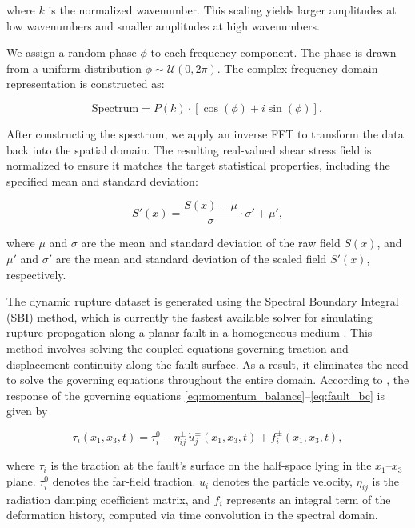 \documentclass[draft]{agujournal2019}
\begin{document}
where \(k\) is the normalized wavenumber. This scaling yields larger amplitudes at low wavenumbers and smaller amplitudes at high wavenumbers.

We assign a random phase \( \phi \) to each frequency component. The phase is drawn from a uniform distribution \( \phi \sim \mathcal{U}(0, 2\pi) \). The complex frequency-domain representation is constructed as:

\begin{equation}
\label{eqn:domian_freq}
\text{Spectrum} = P(k) \cdot \left[ \cos(\phi) + i \sin(\phi) \right],
\end{equation}

After constructing the spectrum, we apply an inverse FFT to transform the data back into the spatial domain. The resulting real-valued shear stress field is normalized to ensure it matches the target statistical properties, including the specified mean and standard deviation:

\begin{equation}
\label{eqn:normalized_fractal}
S'(x) = \frac{S(x) - \mu}{\sigma} \cdot \sigma' + \mu',
\end{equation}

where $\mu$ and $\sigma$ are the mean and standard deviation of the raw field $S(x)$, and $\mu'$ and $\sigma'$ are the mean and standard deviation of the scaled field $S'(x)$, respectively.

The dynamic rupture dataset is generated using the Spectral Boundary Integral (SBI) method, which is currently the fastest available solver for simulating rupture propagation along a planar fault in a homogeneous medium \cite{geubelle1995spectral}. This method involves solving the coupled equations governing traction and displacement continuity along the fault surface. As a result, it eliminates the need to solve the governing equations throughout the entire domain. According to \cite{geubelle1995spectral}, the response of the governing equations \ref{eq:momentum_balance}–\ref{eq:fault_bc} is given by

\begin{equation}
\label{eqn:sbi}
\tau_i(x_1, x_3, t) = \tau_i^0 - \eta^{\pm}_{ij} \, \dot{u}^{\pm}_j(x_1, x_3, t) + f^{\pm}_i(x_1, x_3, t),
\end{equation}

where \(\tau_{i}\) is the traction at the fault's surface on the half-space lying in the \(x_{1}\)–\(x_{3}\) plane. \(\tau_i^0\) denotes the far-field traction. \(\dot{u}_i\) denotes the particle velocity, \(\eta_{ij}\) is the radiation damping coefficient matrix, and \(f_i\) represents an integral term of the deformation history, computed via time convolution in the spectral domain.
\end{document}

